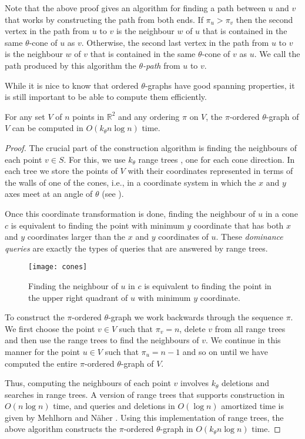 \documentclass{elsart}
\begin{document}
Note that the above proof gives an algorithm for finding a path
between $u$ and $v$ that works by constructing the path from both
ends.  If $\pi_u>\pi_v$ then the second vertex in the path from $u$ to
$v$ is the neighbour $w$ of $u$ that is contained in the same
$\theta$-cone of $u$ as $v$.  Otherwise, the second last vertex in the
path from $u$ to $v$ is the neighbour $w$ of $v$ that is contained in
the same $\theta$-cone of $v$ as $u$.  We call the path produced by
this algorithm the \emph{$\theta$-path} from $u$ to $v$.

While it is nice to know that ordered $\theta$-graphs have good
spanning properties, it is still important to be able to compute them
efficiently.

\begin{lem}
For any set $V$ of $n$ points in $\mathbb{R}^2$ and any ordering $\pi$
on $V$, the $\pi$-ordered $\theta$-graph of $V$ can be computed in
$O(k_\theta n\log n)$ time.
\end{lem}

\begin{proof}
The crucial part of the construction algorithm is finding the
neighbours of each point $v\in S$.  For this, we use $k_\theta$ range
trees \cite{b78}, one for each cone direction.  In each tree we store
the points of $V$ with their coordinates represented in terms of the
walls of one of the cones, i.e., in a coordinate system in which the
$x$ and $y$ axes meet at an angle of $\theta$ (see ).

Once this coordinate transformation is done, finding the neighbour of
$u$ in a cone $c$ is equivalent to finding the point with minimum $y$
coordinate that has both $x$ and $y$ coordinates larger than the $x$
and $y$ coordinates of $u$.  These \emph{dominance queries} are
exactly the types of queries that are answered by range trees.

\begin{figure}
\begin{center}\texttt{[image: cones]}\end{center}
\caption{Finding the neighbour of $u$ in $c$ is equivalent to finding
	the point in the upper right quadrant of $u$ with minimum $y$
	coordinate.}
\end{figure}

To construct the $\pi$-ordered $\theta$-graph we work backwards
through the sequence $\pi$.  We first choose the point $v\in V$ such
that $\pi_v=n$, delete $v$ from all range trees and then use the range
trees to find the neighbours of $v$.  We continue in this manner for
the point $u\in V$ such that $\pi_u=n-1$ and so on until we have
computed the entire $\pi$-ordered $\theta$-graph of $V$.

Thus, computing the neighbours of each point $v$ involves $k_\theta$
deletions and searches in range trees.  A version of range trees that
supports construction in $O(n\log n)$ time, and queries and deletions
in $O(\log n)$ amortized time is given by Mehlhorn and N\"aher
\cite{mn90}.  Using this implementation of range trees, the above
algorithm constructs the $\pi$-ordered $\theta$-graph in $O(k_\theta
n\log n)$ time.
\end{proof}
\end{document}
